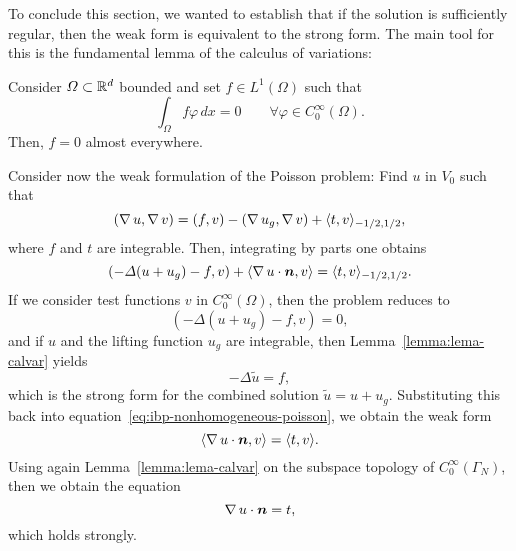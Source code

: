 To conclude this section, we wanted to establish that if the solution is sufficiently regular, then the weak form is equivalent to the strong form. The main tool for this is the fundamental lemma of the calculus of variations: 

\begin{lemma}\label{lemma:lema-calvar}
    Consider $\Omega\subset \mathbb{R}^d$ bounded and set $f\in L^1(\Omega)$ such that
    \begin{equation}\label{eq:lemma-calvar}
        \int_\Omega f\varphi\,dx = 0 \qquad \forall \varphi \in C_0^\infty(\Omega).
    \end{equation}
    Then, $f=0$ almost everywhere.
\end{lemma}

Consider now the weak formulation of the Poisson problem: Find $u$ in $V_0$ such that 
\begin{equation}
    (\operatorname{\nabla} u, \operatorname{\nabla} v) = (f, v) - (\operatorname{\nabla} u_g, \operatorname{\nabla} v) + \langle t, v\rangle_{-1/2, 1/2},
\end{equation}
where $f$ and $t$ are integrable. Then, integrating by parts one obtains
\begin{equation}\label{eq:ibp-nonhomogeneous-poisson}
    (-\Delta (u+u_g) - f, v)+\langle \grad u \cdot \vec n, v\rangle = \langle t, v\rangle_{-1/2,1/2}.
\end{equation}
If we consider test functions $v$ in $C_0^\infty(\Omega)$, then the problem reduces to
\begin{equation}
    (-\Delta (u+u_g) - f, v) = 0,
\end{equation}
and if $u$ and the lifting function $u_g$ are integrable, then Lemma~\ref{lemma:lema-calvar} yields
\begin{equation*}
    -\Delta \tilde u = f,
\end{equation*}
which is the strong form for the combined solution $\tilde u= u + u_g$. Substituting this back into equation~\eqref{eq:ibp-nonhomogeneous-poisson}, we obtain the weak form
\begin{equation*}
    \langle \grad u \cdot \vec n, v\rangle = \langle t, v\rangle.
\end{equation*}
Using again Lemma~\ref{lemma:lema-calvar} on the subspace topology of $C_0^\infty(\Gamma_N)$, then we obtain the equation
\begin{equation*}
    \grad u\cdot \vec n = t,
\end{equation*}
which holds strongly.\\

